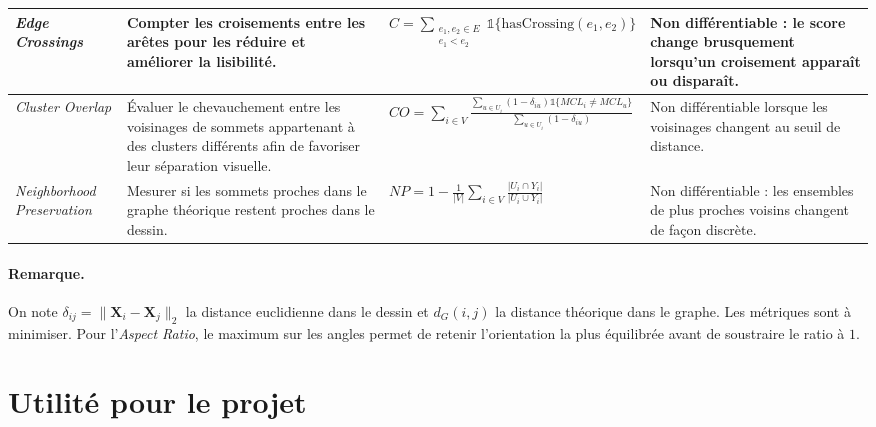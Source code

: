 \documentclass[a4paper,11pt]{article}
\begin{document}
\begin{longtable}{|p{2.1cm}|p{2.8cm}|p{7.1cm}|p{3.1cm}|}
\textit{Edge Crossings}
&
Compter les croisements entre les arêtes pour les réduire et améliorer la lisibilité.
&
$\displaystyle C=\sum_{\substack{e_1,e_2\in E \\ e_1 < e_2}} \mathds{1}\{\mathrm{hasCrossing}(e_1,e_2)\}$
&
Non différentiable : le score change brusquement lorsqu’un croisement apparaît ou disparaît. \\
\hline

\textit{Cluster Overlap}
&
Évaluer le chevauchement entre les voisinages de sommets appartenant à des clusters différents afin de favoriser leur séparation visuelle.
&
$\displaystyle CO=\sum_{i\in V} \frac{\sum_{u\in U_i} (1-\delta_{iu}) \mathds{1}\{MCL_i\ne MCL_u\}}{\sum_{u\in U_i} (1-\delta_{iu})}$
&
Non différentiable lorsque les voisinages changent au seuil de distance. \\
\hline

\textit{Neighborhood Preservation}
&
Mesurer si les sommets proches dans le graphe théorique restent proches dans le dessin.
&
$\displaystyle NP=1-\frac{1}{|V|} \sum_{i\in V} \frac{|U_i\cap Y_i|}{|U_i\cup Y_i|}$
&
Non différentiable : les ensembles de plus proches voisins changent de façon discrète. \\
\hline

\end{longtable}
\normalsize

\paragraph{Remarque.}
On note $\delta_{ij}=\|\mathbf X_i-\mathbf X_j\|_2$ la distance euclidienne dans le dessin et $d_G(i,j)$ la distance théorique dans le graphe. Les métriques sont à minimiser. Pour l'\textit{Aspect Ratio}, le maximum sur les angles permet de retenir l'orientation la plus équilibrée avant de soustraire le ratio à $1$.

\section{Utilité pour le projet}
\end{document}
